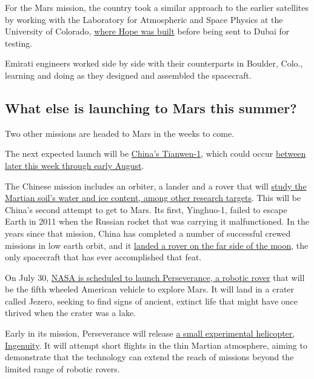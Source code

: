 For the Mars mission, the country took a similar approach to the earlier
satellites by working with the Laboratory for Atmospheric and Space
Physics at the University of Colorado,
\href{https://www.nytimes3xbfgragh.onion/2020/02/15/science/mars-united-arab-emirates.html}{where
Hope was built} before being sent to Dubai for testing.

Emirati engineers worked side by side with their counterparts in
Boulder, Colo., learning and doing as they designed and assembled the
spacecraft.

\hypertarget{what-else-is-launching-to-mars-this-summer}{%
\subsection{What else is launching to Mars this
summer?}\label{what-else-is-launching-to-mars-this-summer}}

Two other missions are headed to Mars in the weeks to come.

The next expected launch will be
\href{https://www.nytimes3xbfgragh.onion/2020/07/22/science/china-mars-mission.html}{China's
Tianwen-1}, which could occur
\href{http://www.xinhuanet.com/english/2020-07/17/c_139219529.htm}{between
later this week through early August}.

The Chinese mission includes an orbiter, a lander and a rover that will
\href{https://nssdc.gsfc.nasa.gov/nmc/spacecraft/display.action?id=HUOXING+1}{study
the Martian soil's water and ice content, among other research targets}.
This will be China's second attempt to get to Mars. Its first,
Yinghuo-1, failed to escape Earth in 2011 when the Russian rocket that
was carrying it malfunctioned. In the years since that mission, China
has completed a number of successful crewed missions in low earth orbit,
and it
\href{https://www.nytimes3xbfgragh.onion/2020/02/26/science/china-moon-far-side.html}{landed
a rover on the far side of the moon}, the only spacecraft that has ever
accomplished that feat.

On July 30,
\href{https://www.nytimes3xbfgragh.onion/2020/03/05/science/mars-2020-rover-name.html}{NASA
is scheduled to launch Perseverance, a robotic rover} that will be the
fifth wheeled American vehicle to explore Mars. It will land in a crater
called Jezero, seeking to find signs of ancient, extinct life that might
have once thrived when the crater was a lake.

Early in its mission, Perseverance will release
\href{https://www.nytimes3xbfgragh.onion/2020/06/23/science/mars-helicopter-nasa.html}{a
small experimental helicopter, Ingenuity}. It will attempt short flights
in the thin Martian atmosphere, aiming to demonstrate that the
technology can extend the reach of missions beyond the limited range of
robotic rovers.

